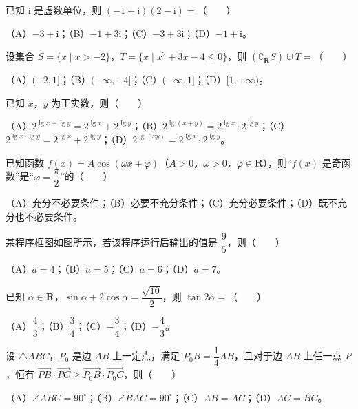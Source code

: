 \begin{question}
已知 $\mathrm i$ 是虚数单位，则 $(-1+\mathrm i)(2-\mathrm i)=$\mbox{（　　）}

（A）$-3+\mathrm i$；（B）$-1+3\mathrm i$；（C）$-3+3\mathrm i$；（D）$-1+\mathrm i$。

\end{question}
\begin{question}
设集合 $S=\{x\mid x>-2\}$，$T=\{x\mid x^2+3x-4\leqslant0\}$，则 $(\complement_{\mathbf R}S)\cup T=$\mbox{（　　）}

（A）$(-2,1]$；（B）$(-\infty,-4]$；（C）$(-\infty,1]$；（D）$[1,+\infty)$。

\end{question}
\begin{question}
已知 $x$，$y$ 为正实数，则\mbox{（　　）}

（A）$2^{\lg x+\lg y}=2^{\lg x}+2^{\lg y}$；（B）$2^{\lg(x+y)}=2^{\lg x}\cdot2^{\lg y}$；（C）$2^{\lg x\cdot\lg y}=2^{\lg x}+2^{\lg y}$；（D）$2^{\lg(xy)}=2^{\lg x}\cdot2^{\lg y}$。

\end{question}
\begin{question}
已知函数 $f(x)=A\cos(\omega x+\varphi)$（$A>0$，$\omega>0$，$\varphi\in\mathbf R$），则“$f(x)$ 是奇函数”是“$\varphi=\dfrac\pi2$”的\mbox{（　　）}

（A）充分不必要条件；（B）必要不充分条件；（C）充分必要条件；（D）既不充分也不必要条件。

\Needspace{0.4\textheight}
\end{question}
\begin{question}
某程序框图如图所示，若该程序运行后输出的值是 $\dfrac95$，则\mbox{（　　）}
\nopagebreak[4]
\begin{center}\end{center}
\nopagebreak[4]
（A）$a=4$；（B）$a=5$；（C）$a=6$；（D）$a=7$。

\end{question}
\begin{question}
已知 $\alpha\in\mathbf R$，$\sin\alpha+2\cos\alpha=\dfrac{\sqrt{10}}2$，则 $\tan2\alpha=$\mbox{（　　）}

（A）$\dfrac43$；（B）$\dfrac34$；（C）$-\dfrac34$；（D）$-\dfrac43$。

\end{question}
\begin{question}
设 $\triangle ABC$，$P_0$ 是边 $AB$ 上一定点，满足 $P_0B=\dfrac14AB$，且对于边 $AB$ 上任一点 $P$，恒有 $\overrightarrow{PB}\cdot\overrightarrow{PC}\geqslant\overrightarrow{P_0B}\cdot\overrightarrow{P_0C}$，则\mbox{（　　）}

（A）$\angle ABC=90^\circ$；（B）$\angle BAC=90^\circ$；（C）$AB=AC$；（D）$AC=BC$。

\end{question}
